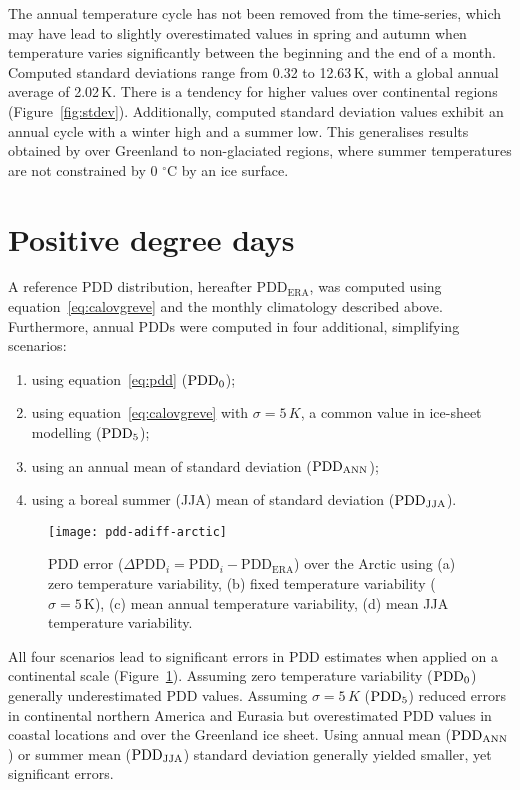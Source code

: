\documentclass[review]{igs}
\begin{document}
The annual temperature cycle has not been removed from the time-series, which may have lead to slightly overestimated values in spring and autumn when temperature varies significantly between the beginning and the end of a month. Computed standard deviations range from 0.32 to 12.63\,K, with a global annual average of 2.02\,K. There is a tendency for higher values over continental regions (Figure~\ref{fig:stdev}). Additionally, computed standard deviation values exhibit an annual cycle with a winter high and a summer low. This generalises results obtained by \citet{fausto-etal-2011} over Greenland to non-glaciated regions, where summer temperatures are not constrained by 0 $^\circ$C by an ice surface.


\section{Positive degree days}

A reference PDD distribution, hereafter $\mathrm{PDD_{ERA}}$, was computed using equation~\ref{eq:calovgreve} and the monthly climatology described above. Furthermore, annual PDDs were computed in four additional, simplifying scenarios:

\begin{enumerate}
  \item using equation~\ref{eq:pdd} ($\rm PDD_0$);
  \item using equation~\ref{eq:calovgreve} with $\sigma=5\,K$, a common value in ice-sheet modelling \citep{huybrechts-dewolde-1999,seddik-etal-2012,charbit-etal-2013} ($\rm PDD_5$);
  \item using an annual mean of standard deviation ($\rm PDD_{ANN}$);
  \item using a boreal summer (JJA) mean of standard deviation ($\rm PDD_{JJA}$).
\end{enumerate}

\begin{figure}
  \centering\texttt{[image: pdd-adiff-arctic]}
  \caption{PDD error ($\Delta\mathrm{PDD}_i = \mathrm{PDD}_i - \mathrm{PDD_{ERA}}$) over the Arctic using (a) zero temperature variability, (b) fixed temperature variability ($\sigma=5\,\mathrm{K}$), (c) mean annual temperature variability, (d) mean JJA temperature variability.}
  \label{fig:pdd}
\end{figure}

All four scenarios lead to significant errors in PDD estimates when applied on a continental scale (Figure~\ref{fig:pdd}). Assuming zero temperature variability ($\rm PDD_0$) generally underestimated PDD values. Assuming $\sigma=5\,K$ ($\rm PDD_5$) reduced errors in continental northern America and Eurasia but overestimated PDD values in coastal locations and over the Greenland ice sheet. Using annual mean ($\rm PDD_{ANN}$) or summer mean ($\rm PDD_{JJA}$) standard deviation generally yielded smaller, yet significant errors.
\end{document}
